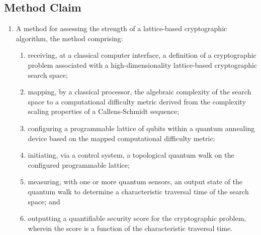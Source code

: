 \documentclass{article}
\begin{document}
\subsection{Method Claim}
\begin{enumerate}
    \item[1.] A method for assessing the strength of a lattice-based cryptographic algorithm, the method comprising:
    \begin{enumerate}
        \item[(a)] receiving, at a classical computer interface, a definition of a cryptographic problem associated with a high-dimensionality lattice-based cryptographic search space;
        \item[(b)] mapping, by a classical processor, the algebraic complexity of the search space to a computational difficulty metric derived from the complexity scaling properties of a Callens-Schmidt sequence;
        \item[(c)] configuring a programmable lattice of qubits within a quantum annealing device based on the mapped computational difficulty metric;
        \item[(d)] initiating, via a control system, a topological quantum walk on the configured programmable lattice;
        \item[(e)] measuring, with one or more quantum sensors, an output state of the quantum walk to determine a characteristic traversal time of the search space; and
        \item[(f)] outputting a quantifiable security score for the cryptographic problem, wherein the score is a function of the characteristic traversal time.
    \end{enumerate}
\end{enumerate}
\end{document}
